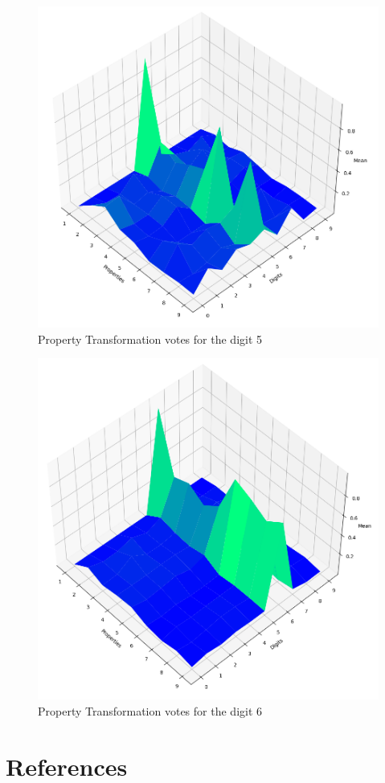 \documentclass[conference]{IEEEtran}
\begin{document}
\begin{figure}[htbp]
\centerline{\includegraphics[width=160mm]{./images/digit-5.png}}
\caption{Property Transformation votes for the digit 5}
\label{digit5votes}
\end{figure}

\begin{figure}[htbp]
\centerline{\includegraphics[width=160mm]{./images/digit-6.png}}
\caption{Property Transformation votes for the digit 6}
\label{digit6votes}
\end{figure}


\section{References}

{}
\end{document}
